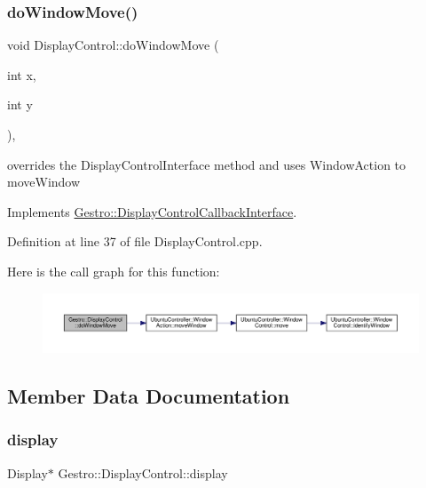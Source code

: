 \subsubsection{\texorpdfstring{do\+Window\+Move()}{doWindowMove()}}
{\footnotesize\ttfamily void Display\+Control\+::do\+Window\+Move (\begin{DoxyParamCaption}\item[{int}]{x,  }\item[{int}]{y }\end{DoxyParamCaption})\hspace{0.3cm}{\ttfamily [override]}, {\ttfamily [virtual]}}

overrides the Display\+Control\+Interface method and uses Window\+Action to move\+Window 

Implements \hyperlink{class_gestro_1_1_display_control_callback_interface_a5232eef7102a1db6d227189132c92ebd}{Gestro\+::\+Display\+Control\+Callback\+Interface}.



Definition at line 37 of file Display\+Control.\+cpp.

Here is the call graph for this function\+:
\nopagebreak
\begin{figure}[H]
\begin{center}
\leavevmode
\includegraphics[width=350pt]{class_gestro_1_1_display_control_aca4208c53cac28e164e7949effdc04cd_cgraph}
\end{center}
\end{figure}


\subsection{Member Data Documentation}
\mbox{\label{class_gestro_1_1_display_control_a6a6844fa13ff67a20596cacd8c5c52d8}} 
\subsubsection{\texorpdfstring{display}{display}}
{\footnotesize\ttfamily Display$\ast$ Gestro\+::\+Display\+Control\+::display\hspace{0.3cm}{\ttfamily [private]}}



